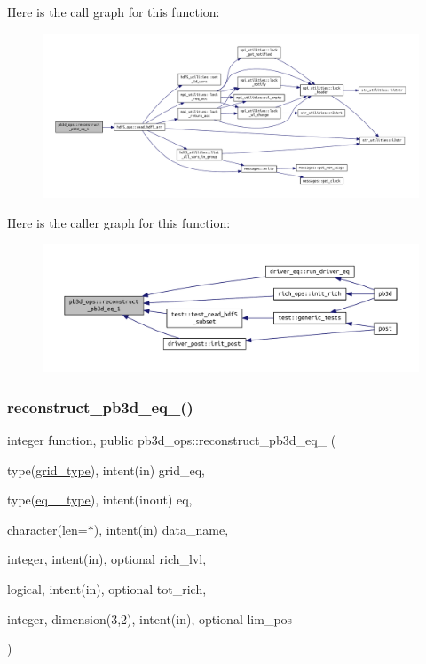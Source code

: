 Here is the call graph for this function\+:\nopagebreak
\begin{figure}[H]
\begin{center}
\leavevmode
\includegraphics[width=350pt]{namespacepb3d__ops_a3142ca9965fa01b2777db762ed1a6eba_cgraph}
\end{center}
\end{figure}
Here is the caller graph for this function\+:\nopagebreak
\begin{figure}[H]
\begin{center}
\leavevmode
\includegraphics[width=350pt]{namespacepb3d__ops_a3142ca9965fa01b2777db762ed1a6eba_icgraph}
\end{center}
\end{figure}
\mbox{\label{namespacepb3d__ops_aaf99ae865680f4cf0a0a9932786689bf}} 
\subsubsection{\texorpdfstring{reconstruct\+\_\+pb3d\+\_\+eq\+\_()}{reconstruct\_pb3d\_eq\_2()}}
{\footnotesize\ttfamily integer function, public pb3d\+\_\+ops\+::reconstruct\+\_\+pb3d\+\_\+eq\+\_ (\begin{DoxyParamCaption}\item[{type(\hyperlink{structgrid__vars_1_1grid__type}{grid\+\_\+type}), intent(in)}]{grid\+\_\+eq,  }\item[{type(\hyperlink{structeq__vars_1_1eq__2__type}{eq\+\_\+2\+\_\+type}), intent(inout)}]{eq,  }\item[{character(len=$\ast$), intent(in)}]{data\+\_\+name,  }\item[{integer, intent(in), optional}]{rich\+\_\+lvl,  }\item[{logical, intent(in), optional}]{tot\+\_\+rich,  }\item[{integer, dimension(3,2), intent(in), optional}]{lim\+\_\+pos }\end{DoxyParamCaption})}



